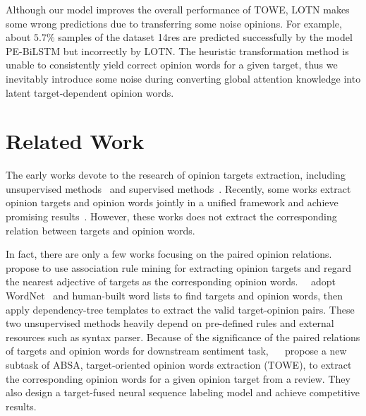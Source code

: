 \documentclass[letterpaper]{article} \usepackage{aaai20}  \usepackage{times}  \usepackage{helvet} \usepackage{courier}  \usepackage[hyphens]{url}  \usepackage{graphicx} \urlstyle{rm} \def\UrlFont{\rm}  \usepackage{graphicx}
\begin{document}
Although our model improves the overall performance of TOWE, LOTN makes some wrong predictions due to transferring some noise opinions. For example, about $5.7\%$ samples of the dataset 14res are predicted successfully by the model PE-BiLSTM but incorrectly by LOTN. The heuristic transformation method is unable to consistently yield correct opinion words for a given target, thus we inevitably introduce some noise during converting global attention knowledge into latent target-dependent opinion words.

\section{Related Work}
The early works devote to the research of opinion targets extraction, including unsupervised methods~\cite{DBLP:conf/naacl/PopescuE05,DBLP:conf/ijcnlp/0003W08,DBLP:journals/coling/QiuLBC11,DBLP:conf/emnlp/LiuXZ12} and supervised methods~\cite{jin2009novel,DBLP:conf/coling/LiHHZXZY10,DBLP:conf/emnlp/LiuJM15,DBLP:journals/kbs/PoriaCG16,DBLP:conf/acl/XuLSY18}. Recently, some works extract opinion targets and opinion words jointly in a unified framework and achieve promising results~\cite{DBLP:journals/coling/QiuLBC11,DBLP:conf/emnlp/LiuXZ12,DBLP:conf/ijcai/LiuXLZ13,DBLP:conf/emnlp/WangPDX16,DBLP:conf/aaai/WangPDX17,DBLP:conf/emnlp/LiL17}. However, these works does not extract the corresponding relation between targets and opinion words.

In fact, there are only a few works focusing on the paired opinion relations.~\citeauthor{DBLP:conf/kdd/HuL04}~ propose to use association rule mining for extracting opinion targets and regard the nearest adjective of targets as the corresponding opinion words.~\citeauthor{DBLP:conf/cikm/ZhuangJZ06}~ adopt WordNet~\cite{miller1995wordnet} and human-built word lists to find targets and opinion words, then apply dependency-tree templates to extract the valid target-opinion pairs. These two unsupervised methods heavily depend on pre-defined rules and external resources such as syntax parser. Because of the significance of the paired relations of targets and opinion words for downstream sentiment task, ~\citeauthor{DBLP:conf/naacl/FanWDHC19}~ propose a new subtask of ABSA, target-oriented opinion words extraction (TOWE), to extract the corresponding opinion words for a given opinion target from a review. They also design a target-fused neural sequence labeling model and achieve competitive results.
\end{document}
